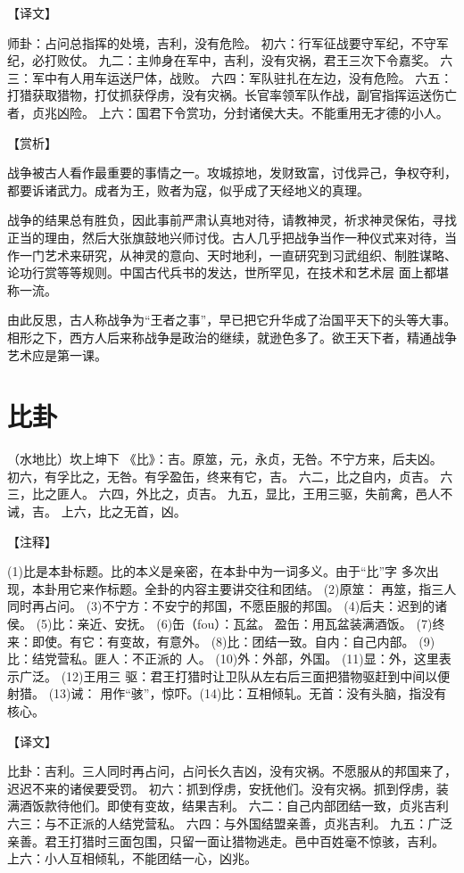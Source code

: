 \documentclass[a4paper,12pt,UTF8,twoside]{ctexbook}
\begin{document}
【译文】

师卦：占问总指挥的处境，吉利，没有危险。
初六：行军征战要守军纪，不守军纪，必打败仗。
九二：主帅身在军中，吉利，没有灾祸，君王三次下令嘉奖。
六三：军中有人用车运送尸体，战败。
六四：军队驻扎在左边，没有危险。
六五：打猎获取猎物，打仗抓获俘虏，没有灾祸。长官率领军队作战，副官指挥运送伤亡者，贞兆凶险。
上六：国君下令赏功，分封诸侯大夫。不能重用无才德的小人。

【赏析】

战争被古人看作最重要的事情之一。攻城掠地，发财致富，讨伐异己，争权夺利，都要诉诸武力。成者为王，败者为寇，似乎成了天经地义的真理。

战争的结果总有胜负，因此事前严肃认真地对待，请教神灵，祈求神灵保佑，寻找正当的理由，然后大张旗鼓地兴师讨伐。古人几乎把战争当作一种仪式来对待，当作一门艺术来研究，从神灵的意向、天时地利，一直研究到习武组织、制胜谋略、论功行赏等等规则。中国古代兵书的发达，世所罕见，在技术和艺术层 面上都堪称一流。

由此反思，古人称战争为“王者之事”，早已把它升华成了治国平天下的头等大事。相形之下，西方人后来称战争是政治的继续，就逊色多了。欲王天下者，精通战争艺术应是第一课。

\chapter{比卦}

（水地比）坎上坤下
《比》：吉。原筮，元，永贞，无咎。不宁方来，后夫凶。
初六，有孚比之，无咎。有孚盈缶，终来有它，吉。
六二，比之自内，贞吉。
六三，比之匪人。
六四，外比之，贞吉。
九五，显比，王用三驱，失前禽，邑人不诫，吉。
上六，比之无首，凶。

【注释】

(1)比是本卦标题。比的本义是亲密，在本卦中为一词多义。由于“比”字 多次出现，本卦用它来作标题。全卦的内容主要讲交往和团结。
(2)原筮： 再筮，指三人同时再占问。
(3)不宁方：不安宁的邦国，不愿臣服的邦国。
(4)后夫：迟到的诸侯。
(5)比：亲近、安抚。
(6)缶（fou）：瓦盆。 盈缶：用瓦盆装满酒饭。
(7)终来：即使。有它：有变故，有意外。
(8)比：团结一致。自内：自己内部。
(9)比：结党营私。匪人：不正派的 人。
(10)外：外部，外国。
(11)显：外，这里表示广泛。
(12)王用三 驱：君王打猎时让卫队从左右后三面把猎物驱赶到中间以便射猎。
(13)诫： 用作“骇”，惊吓。(14)比：互相倾轧。无首：没有头脑，指没有核心。

【译文】

比卦：吉利。三人同时再占问，占问长久吉凶，没有灾祸。不愿服从的邦国来了，迟迟不来的诸侯要受罚。
初六：抓到俘虏，安抚他们。没有灾祸。抓到俘虏，装满酒饭款待他们。即使有变故，结果吉利。
六二：自己内部团结一致，贞兆吉利
六三：与不正派的人结党营私。
六四：与外国结盟亲善，贞兆吉利。
九五：广泛亲善。君王打猎时三面包围，只留一面让猎物逃走。邑中百姓毫不惊骇，吉利。 上六：小人互相倾轧，不能团结一心，凶兆。
\end{document}
